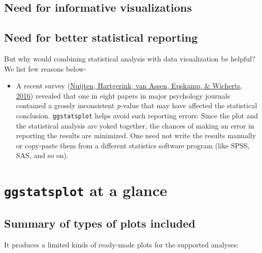 \documentclass[
]{article}
\providecommand{\tightlist}{%
  \setlength{\itemsep}{0pt}\setlength{\parskip}{0pt}}
\begin{document}
\hypertarget{need-for-informative-visualizations}{%
\subsection{Need for informative visualizations}\label{need-for-informative-visualizations}}

\hypertarget{need-for-better-statistical-reporting}{%
\subsection{Need for better statistical reporting}\label{need-for-better-statistical-reporting}}

But why would combining statistical analysis with data visualization be helpful?
We list few reasons below-

\begin{itemize}
\tightlist
\item
  A recent survey (\protect\hyperlink{ref-nuijtenPrevalenceStatisticalReporting2016}{Nuijten, Hartgerink, van Assen, Epskamp, \& Wicherts, 2016}) revealed that
  one in eight papers in major psychology journals contained a grossly
  inconsistent \emph{p}-value that may have affected the statistical conclusion.
  \texttt{ggstatsplot} helps avoid such reporting errors: Since the plot and the
  statistical analysis are yoked together, the chances of making an error in
  reporting the results are minimized. One need not write the results manually
  or copy-paste them from a different statistics software program (like SPSS,
  SAS, and so on).
\end{itemize}

\hypertarget{ggstatsplot-at-a-glance}{%
\section{\texorpdfstring{\texttt{ggstatsplot} at a glance}{ggstatsplot at a glance}}\label{ggstatsplot-at-a-glance}}

\hypertarget{summary-of-types-of-plots-included}{%
\subsection{Summary of types of plots included}\label{summary-of-types-of-plots-included}}

It produces a limited kinds of ready-made plots for the supported analyses:
\end{document}
